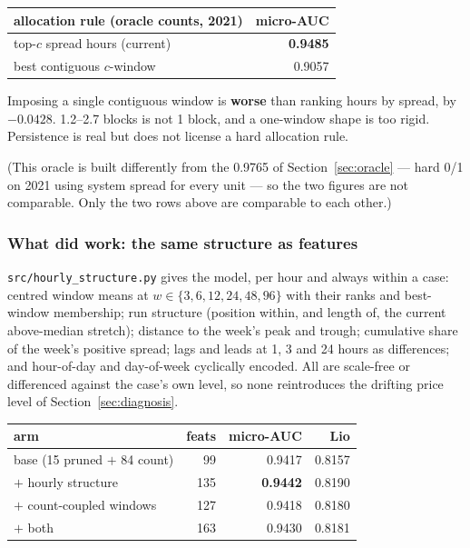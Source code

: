 \begin{center}\small
\begin{tabular}{lr}
\toprule
allocation rule (oracle counts, 2021) & micro-AUC \\
\midrule
top-$c$ spread hours (current) & \textbf{0.9485} \\
best contiguous $c$-window     & 0.9057 \\
\bottomrule
\end{tabular}
\end{center}

\begin{finding}
Imposing a single contiguous window is \textbf{worse} than ranking hours by spread, by $-0.0428$.
1.2--2.7 blocks is not 1 block, and a one-window shape is too rigid. Persistence is real but does
not license a hard allocation rule.
\end{finding}

(This oracle is built differently from the 0.9765 of Section~\ref{sec:oracle} --- hard 0/1 on
2021 using system spread for every unit --- so the two figures are not comparable. Only the two
rows above are comparable to each other.)

\subsubsection*{What did work: the same structure as features}

\texttt{src/hourly\_structure.py} gives the model, per hour and always within a case: centred
window means at $w \in \{3,6,12,24,48,96\}$ with their ranks and best-window membership; run
structure (position within, and length of, the current above-median stretch); distance to the
week's peak and trough; cumulative share of the week's positive spread; lags and leads at 1, 3
and 24 hours as differences; and hour-of-day and day-of-week cyclically encoded. All are
scale-free or differenced against the case's own level, so none reintroduces the drifting price
level of Section~\ref{sec:diagnosis}.

\begin{center}\small
\begin{tabular}{lrrr}
\toprule
arm & feats & micro-AUC & Lio \\
\midrule
base (15 pruned $+$ 84 count) & 99  & 0.9417 & 0.8157 \\
$+$ hourly structure          & 135 & \textbf{0.9442} & 0.8190 \\
$+$ count-coupled windows     & 127 & 0.9418 & 0.8180 \\
$+$ both                      & 163 & 0.9430 & 0.8181 \\
\bottomrule
\end{tabular}
\end{center}

